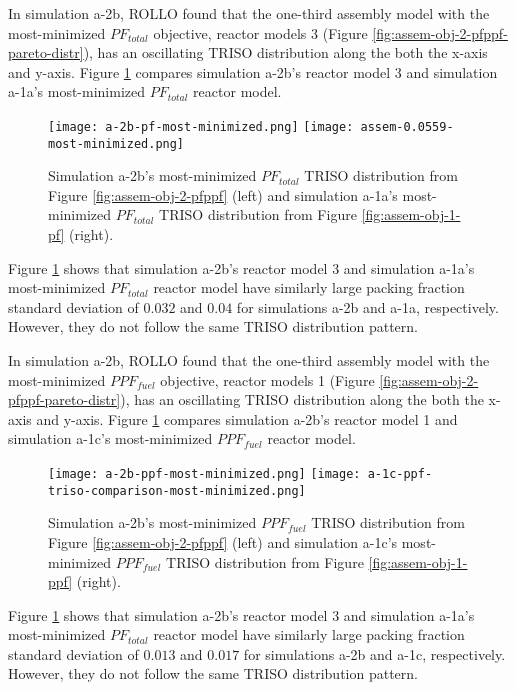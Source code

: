 In simulation a-2b, \gls{ROLLO} found that the one-third assembly model with the 
most-minimized $PF_{total}$ objective, reactor models 3 (Figure 
\ref{fig:assem-obj-2-pfppf-pareto-distr}), has an oscillating TRISO distribution 
along the both the x-axis and y-axis. 
Figure \ref{fig:a-2b-pf-triso-comparison} compares simulation a-2b's reactor model 3 and 
simulation a-1a's most-minimized $PF_{total}$ reactor model. 
\begin{figure}[htbp!]
    \centering
    \texttt{[image: a-2b-pf-most-minimized.png]} 
    \texttt{[image: assem-0.0559-most-minimized.png]} 
    \caption{Simulation a-2b's most-minimized $PF_{total}$ TRISO distribution 
    from Figure \ref{fig:assem-obj-2-pfppf} (left) and simulation a-1a's 
    most-minimized $PF_{total}$ TRISO distribution from Figure 
    \ref{fig:assem-obj-1-pf} (right).}
    \label{fig:a-2b-pf-triso-comparison}
\end{figure}
Figure \ref{fig:a-2b-pf-triso-comparison} shows that simulation a-2b's reactor model 3 
and simulation a-1a's most-minimized $PF_{total}$ reactor model have similarly large 
packing fraction standard deviation of $0.032$ and $0.04$ for simulations a-2b and 
a-1a, respectively. 
However, they do not follow the same TRISO distribution pattern. 

In simulation a-2b, \gls{ROLLO} found that the one-third assembly model with the 
most-minimized $PPF_{fuel}$ objective, reactor models 1 (Figure 
\ref{fig:assem-obj-2-pfppf-pareto-distr}), has an oscillating TRISO distribution 
along the both the x-axis and y-axis. 
Figure \ref{fig:a-2b-pf-triso-comparison} compares simulation a-2b's reactor model 1 and 
simulation a-1c's most-minimized $PPF_{fuel}$ reactor model. 
\begin{figure}[htbp!]
    \centering
    \texttt{[image: a-2b-ppf-most-minimized.png]} 
    \texttt{[image: a-1c-ppf-triso-comparison-most-minimized.png]} 
    \caption{Simulation a-2b's most-minimized $PPF_{fuel}$ TRISO distribution 
    from Figure \ref{fig:assem-obj-2-pfppf} (left) and simulation a-1c's 
    most-minimized $PPF_{fuel}$ TRISO distribution from Figure 
    \ref{fig:assem-obj-1-ppf} (right).}
    \label{fig:a-2b-ppf-triso-comparison}
\end{figure}
Figure \ref{fig:a-2b-pf-triso-comparison} shows that simulation a-2b's reactor model 3 
and simulation a-1a's most-minimized $PF_{total}$ reactor model have similarly large 
packing fraction standard deviation of $0.013$ and $0.017$ for simulations a-2b and 
a-1c, respectively. 
However, they do not follow the same TRISO distribution pattern. 


